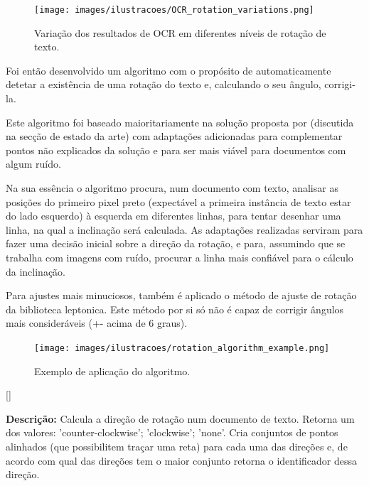 \begin{figure}[H]
	\centering
	\texttt{[image: images/ilustracoes/OCR\_rotation\_variations.png]}
	\caption{Variação dos resultados de OCR em diferentes níveis de rotação de texto.}
	\label{fig:ocr_rotation_variations}
\end{figure}


Foi então desenvolvido um algoritmo com o propósito de automaticamente detetar a existência de uma rotação do texto e, calculando o seu ângulo, corrigi-la. 

Este algoritmo foi baseado maioritariamente na solução proposta por \cite{4283429} (discutida na secção de estado da arte) com adaptações adicionadas para complementar pontos não explicados da solução e para ser mais viável para documentos com algum ruído.

Na sua essência o algoritmo procura, num documento com texto, analisar as posições do primeiro pixel preto (expectável a primeira instância de texto estar do lado esquerdo) à esquerda em diferentes linhas, para tentar desenhar uma linha, na qual a inclinação será calculada. As adaptações realizadas serviram para fazer uma decisão inicial sobre a direção da rotação, e para, assumindo que se trabalha com imagens com ruído, procurar a linha mais confiável para o cálculo da inclinação.

Para ajustes mais minuciosos, também é aplicado o método de ajuste de rotação da biblioteca leptonica. Este método por si só não é capaz de corrigir ângulos mais consideráveis (+- acima de 6 graus).


\begin{figure}[H]
	\centering
	\texttt{[image: images/ilustracoes/rotation\_algorithm\_example.png]}
	\caption{Exemplo de aplicação do algoritmo.}
	\label{fig:rotation_algorithm_example}
\end{figure}

[\normalsize]

\textbf{Descrição:} Calcula a direção de rotação num documento de texto. Retorna um dos valores: 'counter-clockwise'; 'clockwise'; 'none'. Cria conjuntos de pontos alinhados (que possibilitem traçar uma reta) para cada uma das direções e, de acordo com qual das direções tem o maior conjunto retorna o identificador dessa direção.

